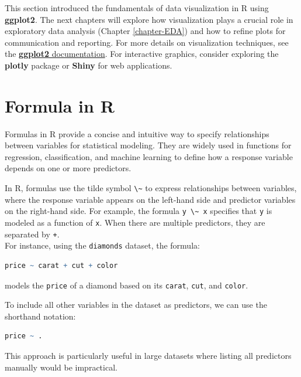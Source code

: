 \documentclass[
]{book}
\newcommand{\passthrough}[1]{#1}
\theoremstyle{definition}
\theoremstyle{definition}
\theoremstyle{definition}
\theoremstyle{definition}
\theoremstyle{remark}
\begin{document}
This section introduced the fundamentals of data visualization in R using \textbf{ggplot2}. The next chapters will explore how visualization plays a crucial role in exploratory data analysis (Chapter \ref{chapter-EDA}) and how to refine plots for communication and reporting. For more details on visualization techniques, see the \href{https://ggplot2.tidyverse.org}{\textbf{ggplot2} documentation}. For interactive graphics, consider exploring the \textbf{plotly} package or \textbf{Shiny} for web applications.

\section{Formula in R}\label{sec-formula-in-R}

Formulas in R provide a concise and intuitive way to specify relationships between variables for statistical modeling. They are widely used in functions for regression, classification, and machine learning to define how a response variable depends on one or more predictors.

In R, formulas use the tilde symbol \passthrough{\lstinline!\~!} to express relationships between variables, where the response variable appears on the left-hand side and predictor variables on the right-hand side. For example, the formula \passthrough{\lstinline!y \~ x!} specifies that \passthrough{\lstinline!y!} is modeled as a function of \passthrough{\lstinline!x!}. When there are multiple predictors, they are separated by \passthrough{\lstinline!+!}.\\
For instance, using the \passthrough{\lstinline!diamonds!} dataset, the formula:

\begin{lstlisting}[language=R]
price ~ carat + cut + color
\end{lstlisting}

models the \passthrough{\lstinline!price!} of a diamond based on its \passthrough{\lstinline!carat!}, \passthrough{\lstinline!cut!}, and \passthrough{\lstinline!color!}.

To include all other variables in the dataset as predictors, we can use the shorthand notation:

\begin{lstlisting}[language=R]
price ~ .
\end{lstlisting}

This approach is particularly useful in large datasets where listing all predictors manually would be impractical.
\end{document}

